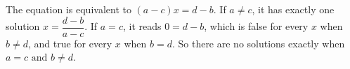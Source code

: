 The equation is equivalent to $(a-c)x=d-b$. If $a\ne c$, it has exactly one solution $x=\dfrac{d-b}{a-c}$. If $a=c$, it reads $0=d-b$, which is false for every $x$ when $b\ne d$, and true for every $x$ when $b=d$. So there are no solutions exactly when $\boxed{a=c\text{ and }b\ne d}$.
